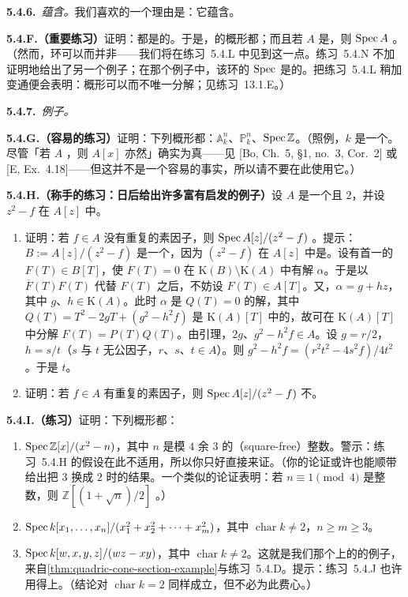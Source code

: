 \textbf{5.4.6.}\ \emph{\trFactoriality{}蕴含\trNormality{}。}\quad 我们喜欢\trFactoriality{}的一个理由是：它蕴含\trNormality。

\textbf{5.4.F.（重要练习）}\quad 证明：\trUFD{}都是\trIntegrallyClosed{}的。于是，\trFactorial{}的概形都\trNormal；而且若 $A$ 是\trUFD，则 $\operatorname{Spec} A$ \trNormal。（然而，环可以\trIntegrallyClosed{}而并非\trUFD——我们将在练习~5.4.L 中见到这一点。练习~5.4.N 不加证明地给出了另一个例子；在那个例子中，该环的 $\operatorname{Spec}$ 是\trFactorial{}的。把练习~5.4.L 稍加变通便会表明：概形可以\trNormal{}而不唯一分解；见练习~13.1.E。）

\textbf{5.4.7.}\ \emph{例子。}

\textbf{5.4.G.（容易的练习）}\quad 证明：下列概形都\trNormal：$\mathbb{A}^n_k$、$\mathbb{P}^n_k$、$\operatorname{Spec}\mathbb{Z}$。（照例，$k$ 是一个\trField。尽管「若 $A$ \trIntegrallyClosed{}，则 $A[x]$ 亦然」确实为真——见 [Bo, Ch.~5, \S1, no.~3, Cor.~2] 或 [E, Ex.~4.18]——但这并不是一个容易的事实，所以请不要在此使用它。）

\textbf{5.4.H.（称手的练习：日后给出许多富有启发的例子）}\quad 设 $A$ 是一个\trUFD{}且 $2$\trInvertible，并设 $z^2-f$ 在 $A[z]$ 中\trIrreducible。
\begin{enumerate}[label=(\alph*)]
  \item 证明：若 $f\in A$ 没有重复的素因子，则 $\operatorname{Spec} A[z]/(z^2-f)$ \trNormal。提示：$B:=A[z]/(z^2-f)$ 是一个\trIntegralDomain，因为 $(z^2-f)$ 在 $A[z]$ 中是\trPrimeIdeal。设有首一的 $F(T)\in B[T]$，使 $F(T)=0$ 在 $\mathrm{K}(B)\setminus\mathrm{K}(A)$ 中有解 $\alpha$。于是以 $\overline{F}(T)F(T)$ 代替 $F(T)$ 之后，不妨设 $F(T)\in A[T]$。又，$\alpha=g+hz$，其中 $g$、$h\in\mathrm{K}(A)$。此时 $\alpha$ 是 $Q(T)=0$ 的解，其中 $Q(T)=T^2-2gT+(g^2-h^2f)$ 是 $\mathrm{K}(A)[T]$ 中的\trMonicPolynomial{}，故可在 $\mathrm{K}(A)[T]$ 中分解 $F(T)=P(T)Q(T)$。由\trGauss{}引理，$2g$、$g^2-h^2f\in A$。设 $g=r/2$，$h=s/t$（$s$ 与 $t$ 无公因子，$r$、$s$、$t\in A$）。则 $g^2-h^2f=(r^2t^2-4s^2f)/4t^2$。于是 $t$\trInvertible。
  \item 证明：若 $f\in A$ 有重复的素因子，则 $\operatorname{Spec} A[z]/(z^2-f)$ 不\trNormal。
\end{enumerate}

\textbf{5.4.I.（练习）}\quad 证明：下列概形都\trNormal：
\begin{enumerate}[label=(\alph*)]
  \item $\operatorname{Spec}\mathbb{Z}[x]/(x^2-n)$，其中 $n$ 是模 $4$ 余 $3$ 的\trSquareFree{}（square-free）整数。警示：练习~5.4.H 的假设在此不适用，所以你只好直接来证。（你的论证或许也能顺带给出把 $3$ 换成 $2$ 时的结果。一个类似的论证表明：若 $n\equiv 1\pmod{4}$ 是\trSquareFree{}整数，则 $\mathbb{Z}[(1+\sqrt{n})/2]$ \trIntegrallyClosed{}。）
  \item $\operatorname{Spec} k[x_1,\dots,x_n]/(x_1^2+x_2^2+\cdots+x_m^2)$，其中 $\operatorname{char}k\neq 2$，$n\ge m\ge 3$。
  \item $\operatorname{Spec} k[w,x,y,z]/(wz-xy)$，其中 $\operatorname{char}k\neq 2$。这就是我们那个\trQuadricSurface{}上的\trCone{}的例子，来自\cref{thm:quadric-cone-section-example}与练习~5.4.D。提示：练习~5.4.J 也许用得上。（结论对 $\operatorname{char}k=2$ 同样成立，但不必为此费心。）
\end{enumerate}

